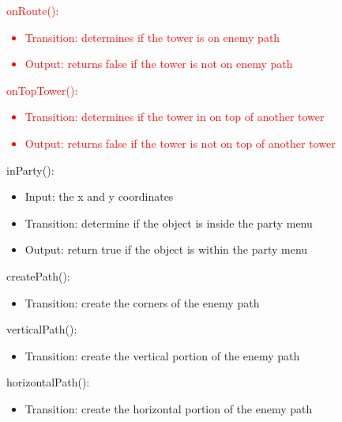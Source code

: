 \documentclass[12,english]{article}
\begin{document}
\noindent \textcolor{red}{onRoute():}
\textcolor{red}{\begin{itemize}
    \item Transition: determines if the tower is on enemy path
    \item Output: returns false if the tower is not on enemy path
\end{itemize}}

\noindent \textcolor{red}{onTopTower():}
\textcolor{red}{\begin{itemize}
    \item Transition: determines if the tower in on top of another tower
    \item Output: returns false if the tower is not on top of another tower
\end{itemize}}


\noindent inParty():
\begin{itemize}
    \item Input: the x and y coordinates
    \item Transition: determine if the object is inside the party menu
    \item Output: return true if the object is within the party menu
\end{itemize}

\noindent createPath():
\begin{itemize}
    \item Transition: create the corners of the enemy path
\end{itemize}

\noindent verticalPath():
\begin{itemize}
    \item Transition: create the vertical portion of the enemy path
\end{itemize}

\noindent horizontalPath():
\begin{itemize}
    \item Transition: create the horizontal portion of the enemy path
\end{itemize}
\end{document}
